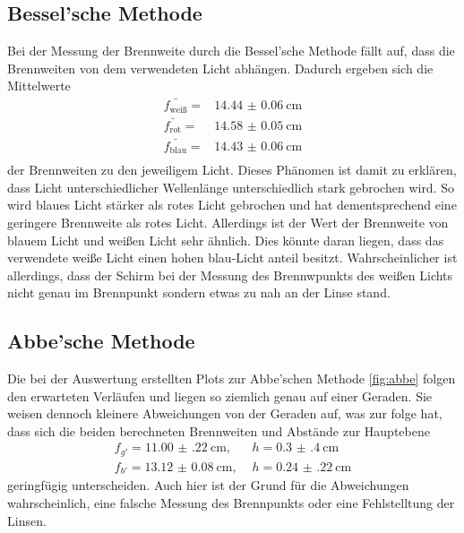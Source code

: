 \subsection{Bessel'sche Methode}
Bei der Messung der Brennweite durch die Bessel'sche Methode fällt auf, dass die Brennweiten von dem verwendeten Licht abhängen.
Dadurch ergeben sich die Mittelwerte 
\begin{align*}
    \bar{f_\text{weiß}} = & \SI{14.44(6)}{\centi\meter} \\
    \bar{f_\text{rot}}  = & \SI{14.58(5)}{\centi\meter} \\
    \bar{f_\text{blau}} = &  \SI{14.43(6)}{\centi\meter} \\
\end{align*}
der Brennweiten zu den jeweiligem Licht.
Dieses Phänomen ist damit zu erklären, dass Licht unterschiedlicher Wellenlänge unterschiedlich stark gebrochen wird.
So wird blaues Licht stärker als rotes Licht gebrochen und hat dementsprechend eine geringere Brennweite als rotes Licht.
Allerdings ist der Wert der Brennweite von blauem Licht und weißen Licht sehr ähnlich.
Dies könnte daran liegen, dass das verwendete weiße Licht einen hohen blau-Licht anteil besitzt.
Wahrscheinlicher ist allerdings, dass der Schirm bei der Messung des Brennwpunkts des weißen Lichts nicht genau im Brennpunkt sondern etwas zu nah an der Linse stand.

\subsection{Abbe'sche Methode}
Die bei der Auswertung erstellten Plots zur Abbe'schen Methode \ref{fig:abbe} folgen den erwarteten Verläufen und liegen so ziemlich genau auf einer Geraden.
Sie weisen dennoch kleinere Abweichungen von der Geraden auf, was zur folge hat, dass sich die beiden berechneten Brennweiten und Abstände zur Hauptebene
\begin{align*}
    f_{g'} = \SI{11.00(22)}{\centi\meter}, & \,\,h = \SI{0.3(4)}{\centi\meter}\\
    f_{b'} = \SI{13.12(8)}{\centi\meter}, & \,\, h = \SI{0.24(22)}{\centi\meter}
\end{align*}
geringfügig unterscheiden.
Auch hier ist der Grund für die Abweichungen wahrscheinlich, eine falsche Messung des Brennpunkts oder eine Fehlstelltung der Linsen.
